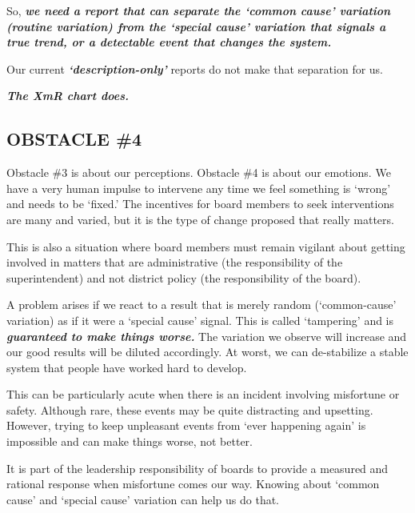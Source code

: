 \documentclass[
  letterpaper,
  DIV=11,
  numbers=noendperiod]{scrartcl}
\begin{document}
So, \textbf{\emph{we need a report that can separate the `common cause'
variation (routine variation) from the `special cause' variation that
signals a true trend, or a detectable event that changes the system.}}

Our current \textbf{\emph{`description-only'}} reports do not make that
separation for us.

\vspace{0.3in}

\textbf{\emph{The XmR chart does.}}

\vspace{0.3in}

\subsection{\texorpdfstring{\textbf{OBSTACLE
\#4}}{OBSTACLE \#4}}\label{obstacle-4}

Obstacle \#3 is about our perceptions. Obstacle \#4 is about our
emotions. We have a very human impulse to intervene any time we feel
something is `wrong' and needs to be `fixed.' The incentives for board
members to seek interventions are many and varied, but it is the type of
change proposed that really matters.

This is also a situation where board members must remain vigilant about
getting involved in matters that are administrative (the responsibility
of the superintendent) and not district policy (the responsibility of
the board).

A problem arises if we react to a result that is merely random
(`common-cause' variation) as if it were a `special cause' signal. This
is called `tampering' and is \textbf{\emph{guaranteed to make things
worse.}} The variation we observe will increase and our good results
will be diluted accordingly. At worst, we can de-stabilize a stable
system that people have worked hard to develop.

This can be particularly acute when there is an incident involving
misfortune or safety. Although rare, these events may be quite
distracting and upsetting. However, trying to keep unpleasant events
from `ever happening again' is impossible and can make things worse, not
better.

It is part of the leadership responsibility of boards to provide a
measured and rational response when misfortune comes our way. Knowing
about `common cause' and `special cause' variation can help us do that.

\vspace{0.3in}
\end{document}
